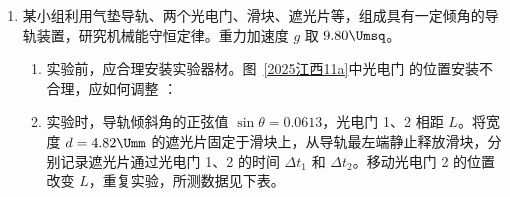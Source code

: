 \documentclass[\gkver]{gaokaozhenti}
\begin{document}
\begin{enumerate}
{ef 边离开磁场时速度恰好为 $v_{0}$，则有 $v_{0}^{2} - v_{\min}^{2} = 2a(d - l)$

联立解得 $v_{\min} = \sqrt{v_{0}^{2} - 4g(d - l)\sin\theta}$，故 A 正确；

B．在 ef 边进入磁场到 gh 边进入磁场的过程中，由动能定理有

$mgl\sin\theta + \mu mgl\cos\theta + W_{\text{安}} = \frac{1}{2}mv_{\min}^{2} - \frac{1}{2}mv_{0}^{2}$

则该过程产生的焦耳热 $Q = -W_{\text{安}} = 2mgd\sin\theta$

在 ef 边离开磁场到 gh 边离开磁场的过程中，线框产生的焦耳热也为 $Q$。因此，线框穿过磁场区域产生的焦耳热为 $4mgd\sin\theta$，故 B 错误；

C．设 ef 边进入磁场到 gh 边进入磁场的时间为 $t_{1}$，根据闭合电路欧姆定律得 $I = \frac{Blv}{R}$

根据动量定理有 $mg\sin\theta \cdot t_{1} + \mu mg\cos\theta \cdot t_{1} - \sum BIL\Delta t = mv_{\min} - mv_{0}$

设 gh 边进入磁场到 ef 边离开磁场的时间为 $t_{2}$，有 $v_{0} - v_{\min} = at_{2}$

因为 ef 边离开磁场到 gh 边离开磁场所用时间也为 $t_{1}$，所以线框穿过磁场区域的总时间 $t = 2t_{1} + t_{2}$

联立解得 $t = \frac{2B^{2}l^{3} + mR(\sqrt{v_{0}^{2} - 4g(d - l)\sin\theta} - v_{0})}{2mgR\sin\theta}$，故 C 错误；

D．ef 边从进入到离开磁场区域的时间 $t' = t_{1} + t_{2}$

该段时间内传送带移动的距离 $s = v_{0}t' = \frac{B^{2}l^{3}v_{0}}{2mgR\sin\theta}$，故 D 正确。

故选 AD。
}

\item
某小组利用气垫导轨、两个光电门、滑块、遮光片等，组成具有一定倾角的导轨装置，研究机械能守恒定律。重力加速度 $g$ 取 $9.80 \Umsq$。

\begin{enumerate}
\item
实验前，应合理安装实验器材。图~\ref{2025江西11a}中光电门  的位置安装不合理，应如何调整 ：
\item
实验时，导轨倾斜角的正弦值 $\sin\theta = 0.0613$，光电门 1、2 相距 $L$。将宽度 $d = 4.82 \Umm$ 的遮光片固定于滑块上，从导轨最左端静止释放滑块，分别记录遮光片通过光电门 1、2 的时间 $\Delta t_{1}$ 和 $\Delta t_{2}$。移动光电门 2 的位置改变 $L$，重复实验，所测数据见下表。


\end{enumerate}
\end{enumerate}
\end{document}

